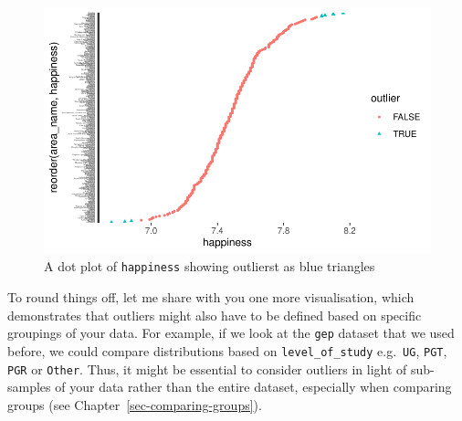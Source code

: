 \documentclass[
  letterpaper,
  DIV=11,
  numbers=noendperiod]{scrreprt}
\begin{document}
\begin{figure}[H]

{\centering \includegraphics{09_sources_of_bias_files/figure-latex/plot-outliers-different-format-1.pdf}

}

\caption{A dot plot of \texttt{happiness} showing outlierst as blue
triangles}

\end{figure}%

To round things off, let me share with you one more visualisation, which
demonstrates that outliers might also have to be defined based on
specific groupings of your data. For example, if we look at the
\texttt{gep} dataset that we used before, we could compare distributions
based on \texttt{level\_of\_study} e.g.~\texttt{UG}, \texttt{PGT},
\texttt{PGR} or \texttt{Other}. Thus, it might be essential to consider
outliers in light of sub-samples of your data rather than the entire
dataset, especially when comparing groups (see
Chapter~\ref{sec-comparing-groups}).
\end{document}
